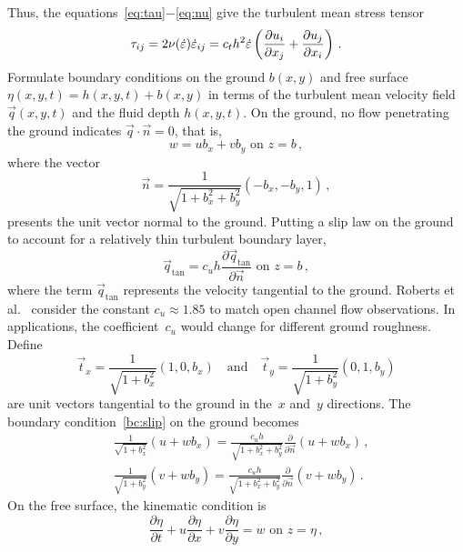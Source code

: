 \documentclass[twocolumn]{afmc_art}
\newcommand{\ros}{{\dot\varepsilon}}
\begin{document}
Thus, the equations~\eqref{eq:tau}$-$\eqref{eq:nu} give the turbulent mean stress tensor
\begin{equation}
\tau_{ij}=2\nu(\ros)\ros_{ij}=c_th^2\ros\left( \D{x_j}{u_i} +\D{x_i}{u_j}\right) \,.\label{eq:stress}
\end{equation}
Formulate boundary conditions on the ground $b(x,y)$ and free surface $\eta(x,y,t)=h(x,y,t)+b(x,y)$ in terms of the turbulent mean velocity field $\vec q(x,y,t)$ and the fluid depth $h(x,y,t)$. 
On the ground, no flow penetrating the ground indicates $\vec q\cdot\vec n=0$, that is,
\begin{equation}
w=ub_x+vb_y \text{ on } z=b\,,
\label{eq:nopen}
\end{equation}
where the vector
\begin{equation}
\vec n=\frac{1}{\sqrt{1+b_x^2+b_y^2}}(-b_x,-b_y,1)\,,\label{eq:vecn}
\end{equation} 
presents the unit vector normal to the ground.  
Putting a slip law on the ground to account for a relatively thin turbulent boundary layer, 
\begin{equation}
\vec q_{\text{tan}}=c_uh\frac{\partial\vec q_{\text{tan}}}{\partial\vec n} \text{ on } z=b\,,
\label{bc:slip}
\end{equation} 
where the term $\vec q_{\text{tan}}$ represents the velocity tangential to the ground. 
Roberts et al.~\cite{Roberts2008} consider the constant $c_u\approx1.85$ to match open channel flow observations. 
In applications, the coefficient~$c_u$ would change for different ground roughness. 
Define
\begin{equation*}
\vec t_x=\frac{1}{\sqrt{1+b_x^2}}(1,0,b_x)
\quad\text{and}\quad
\vec t_y=\frac{1}{\sqrt{1+b_y^2}}(0,1,b_y)
\end{equation*}
are unit vectors tangential to the ground in the~$x$ and~$y$ directions. 
The boundary condition~\eqref{bc:slip} on the ground becomes
\begin{align}&
\frac{1}{\sqrt{1+b_x^2}}(u+wb_x)=\frac{c_uh}{\sqrt{1+b_x^2+b_y^2}}\frac{\partial}{\partial\vec n}(u+wb_x)\,,\label{slip:u}\\&
\frac{1}{\sqrt{1+b_y^2}}(v+wb_y)=\frac{c_uh}{\sqrt{1+b_x^2+b_y^2}}\frac{\partial}{\partial\vec n}(v+wb_y)\,.\label{slip:v}
\end{align}
On the free surface, the kinematic condition is 
\begin{equation}
 \frac{\partial\eta}{\partial t}+u\frac{\partial\eta}{\partial x}+v\frac{\partial\eta}{\partial y}=w \text{ on } z=\eta\,,
\end{equation}
\end{document}
